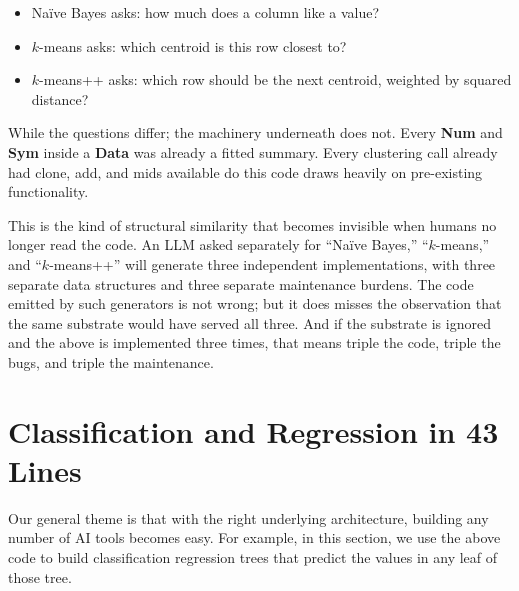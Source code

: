 \documentclass[AMA,STIX2COL]{WileyNJDv5}
\newcommand{\cls}[1]{%
  \setlength{\fboxsep}{1.5pt}%
  \colorbox{clsbg}{\sffamily\bfseries{#1}}%
}
\begin{document}
\begin{itemize}
\item Naïve Bayes asks: how much does a column like a value?
\item $k$-means asks: which centroid is this row closest to?
\item $k$-means++ asks: which row should be the next centroid,
weighted by squared distance?
\end{itemize}
While the questions differ; the machinery underneath does not. Every
\cls{Num} and \cls{Sym} inside a \cls{Data} was already a fitted
summary. Every clustering call already had \textsf{clone},
\textsf{add}, and \textsf{mids} available do this code draws heavily on
pre-existing functionality.

This is the kind of structural similarity that becomes invisible
when humans no longer read the code. An LLM asked separately for
``Naïve Bayes,'' ``$k$-means,'' and ``$k$-means++'' will
generate three independent implementations, with three separate
data structures and three separate maintenance burdens. The
code emitted by such generators is not wrong;
but it does  misses the observation that the same substrate would
have served all three. And if the substrate is ignored and the above
is implemented three times, that  means
triple the code, triple the bugs,  and triple the maintenance. 


  \section{ Classification and Regression in 43 Lines}\label{trees}

 

 Our general theme is that with the right underlying
 architecture, building any number of AI tools becomes
 easy.
For example, in this section, we use the above code to build
classification 
 regression trees that predict the   values in any leaf of those tree.
 
\end{document}
